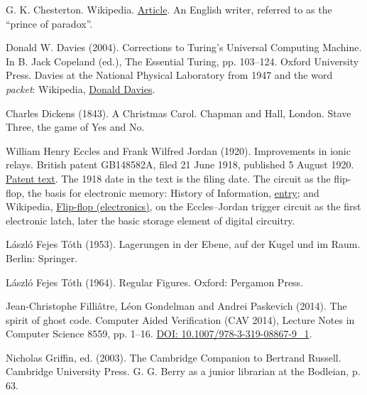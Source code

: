\documentclass[11pt,twoside]{article}
\theoremstyle{thielethm}
\theoremstyle{thieledef}
\theoremstyle{thieledef}
\theoremstyle{thieledef}
\theoremstyle{thielethm}
\theoremstyle{thieleobs}
\theoremstyle{thielethm}
\begin{document}
\noindent G. K. Chesterton. Wikipedia. \href{https://en.wikipedia.org/wiki/G._K._Chesterton}{Article}. An English writer, referred to as the ``prince of paradox''.
\par\medskip

\noindent Donald W. Davies (2004). Corrections to Turing's Universal Computing Machine. In B. Jack Copeland (ed.), The Essential Turing, pp. 103--124. Oxford University Press. Davies at the National Physical Laboratory from 1947 and the word \emph{packet}: Wikipedia, \href{https://en.wikipedia.org/wiki/Donald_Davies}{Donald Davies}.
\par\medskip

\noindent Charles Dickens (1843). A Christmas Carol. Chapman and Hall, London. Stave Three, the game of Yes and No.
\par\medskip

\noindent William Henry Eccles and Frank Wilfred Jordan (1920). Improvements in ionic relays. British patent GB148582A, filed 21 June 1918, published 5 August 1920. \href{https://patents.google.com/patent/GB148582A/en}{Patent text}. The 1918 date in the text is the filing date. The circuit as the flip-flop, the basis for electronic memory: History of Information, \href{https://www.historyofinformation.com/detail.php?id=3606}{entry}; and Wikipedia, \href{https://en.wikipedia.org/wiki/Flip-flop_(electronics)}{Flip-flop (electronics)}, on the Eccles--Jordan trigger circuit as the first electronic latch, later the basic storage element of digital circuitry.
\par\medskip

\noindent László Fejes Tóth (1953). Lagerungen in der Ebene, auf der Kugel und im Raum. Berlin: Springer.
\par\medskip

\noindent László Fejes Tóth (1964). Regular Figures. Oxford: Pergamon Press.
\par\medskip

\noindent Jean-Christophe Filliâtre, Léon Gondelman and Andrei Paskevich (2014). The spirit of ghost code. Computer Aided Verification (CAV 2014), Lecture Notes in Computer Science 8559, pp. 1--16. \href{https://doi.org/10.1007/978-3-319-08867-9_1}{DOI: 10.1007/978-3-319-08867-9\_1}.
\par\medskip

\noindent Nicholas Griffin, ed. (2003). The Cambridge Companion to Bertrand Russell. Cambridge University Press. G. G. Berry as a junior librarian at the Bodleian, p. 63.
\par\medskip
\end{document}
